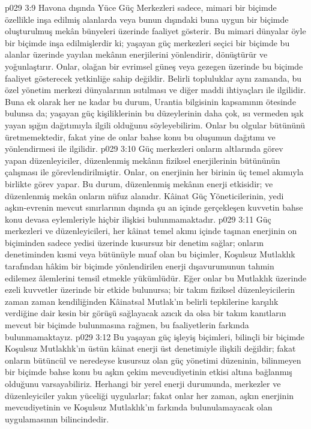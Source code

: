 \vs p029 3:9 Havona dışında Yüce Güç Merkezleri sadece, mimari bir biçimde özellikle inşa edilmiş alanlarda veya bunun dışındaki buna uygun bir biçimde oluşturulmuş mekân bünyeleri üzerinde faaliyet gösterir. Bu mimari dünyalar öyle bir biçimde inşa edilmişlerdir ki; yaşayan güç merkezleri seçici bir biçimde bu alanlar üzerinde yayılan mekânın enerjilerini yönlendirir, dönüştürür ve yoğunlaştırır. Onlar, olağan bir evrimsel güneş veya gezegen üzerinde bu biçimde faaliyet gösterecek yetkinliğe sahip değildir. Belirli topluluklar aynı zamanda, bu özel yönetim merkezi dünyalarının ısıtılması ve diğer maddi ihtiyaçları ile ilgilidir. Buna ek olarak her ne kadar bu durum, Urantia bilgisinin kapsamının ötesinde bulunsa da; yaşayan güç kişiliklerinin bu düzeylerinin daha çok, ısı vermeden ışık yayan ışığın dağıtımıyla ilgili olduğunu söyleyebilirim. Onlar bu olgular bütününü üretmemektedir, fakat yine de onlar bahse konu bu oluşumun dağıtımı ve yönlendirmesi ile ilgilidir.
\vs p029 3:10 Güç merkezleri onların altlarında görev yapan düzenleyiciler, düzenlenmiş mekânın fiziksel enerjilerinin bütününün çalışması ile görevlendirilmiştir. Onlar, on enerjinin her birinin üç temel akımıyla birlikte görev yapar. Bu durum, düzenlenmiş mekânın enerji etkisidir; ve düzenlenmiş mekân onların nüfuz alanıdır. Kâinat Güç Yöneticilerinin, yedi aşkın\hyp{}evrenin mevcut sınırlarının dışında şu an içinde gerçekleşen kuvvetin bahse konu devasa eylemleriyle hiçbir ilişkisi bulunmamaktadır.
\vs p029 3:11 Güç merkezleri ve düzenleyicileri, her kâinat temel akımı içinde taşınan enerjinin on biçiminden sadece yedisi üzerinde kusursuz bir denetim sağlar; onların denetiminden kısmi veya bütünüyle muaf olan bu biçimler, Koşulsuz Mutlaklık tarafından hâkim bir biçimde yönlendirilen enerji dışavurumunun tahmin edilemez âlemlerini temsil etmekle yükümlüdür. Eğer onlar bu Mutlaklık üzerinde ezeli kuvvetler üzerinde bir etkide bulunursa; bir takım fiziksel düzenleyicilerin zaman zaman kendiliğinden Kâinatsal Mutlak’ın belirli tepkilerine karşılık verdiğine dair kesin bir görüşü sağlayacak azıcık da olsa bir takım kanıtların mevcut bir biçimde bulunmasına rağmen, bu faaliyetlerin farkında bulunmamaktayız.
\vs p029 3:12 Bu yaşayan güç işleyiş biçimleri, bilinçli bir biçimde Koşulsuz Mutlaklık’ın üstün kâinat enerji üst denetimiyle ilişkili değildir; fakat onların bütüncül ve neredeyse kusursuz olan güç yönetimi düzeninin, bilinmeyen bir biçimde bahse konu bu aşkın çekim mevcudiyetinin etkisi altına bağlanmış olduğunu varsayabiliriz. Herhangi bir yerel enerji durumunda, merkezler ve düzenleyiciler yakın yüceliği uygularlar; fakat onlar her zaman, aşkın enerjinin mevcudiyetinin ve Koşulsuz Mutlaklık’ın farkında bulunulamayacak olan uygulamasının bilincindedir.
